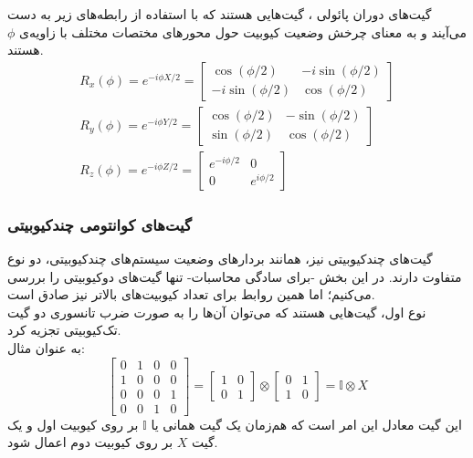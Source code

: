 گیت‌های دوران پائولی
، گیت‌هایی هستند که با استفاده از رابطه‌های زیر به دست می‌آیند و به معنای چرخش وضعیت کیوبیت حول محورهای مختصات مختلف با زاویه‌ی 
$\phi$
هستند.
\begin{equation}
\begin{gathered}
    R_x(\phi) = e^{-i \phi X/2} = 
            \begin{bmatrix}
                \cos(\phi/2) & -i\sin(\phi/2) \\
                -i\sin(\phi/2) & \cos(\phi/2)
            \end{bmatrix}
            \\[3pt]
    R_y(\phi) = e^{-i\phi Y/2} = 
            \begin{bmatrix}
                \cos(\phi/2) & -\sin(\phi/2) \\
                \sin(\phi/2) & \cos(\phi/2)
            \end{bmatrix}
            \\[3pt]
    R_z(\phi) = e^{-i\phi Z/2} = \begin{bmatrix}
                e^{-i\phi/2} & 0 \\
                0 & e^{i\phi/2}
            \end{bmatrix}
\end{gathered}
\end{equation}

\subsubsection{
    گیت‌های کوانتومی چند‌کیوبیتی
}
گیت‌های چندکیوبیتی نیز، همانند بردارهای وضعیت سیستم‌های چندکیوبیتی، دو نوع متفاوت دارند. در این بخش -برای سادگی محاسبات- تنها گیت‌های دوکیوبیتی را بررسی می‌کنیم؛ اما همین روابط برای تعداد کیوبیت‌های بالاتر نیز صادق است. \\
نوع اول، گیت‌هایی هستند که می‌توان آن‌ها را به صورت ضرب تانسوری دو گیت تک‌کیوبیتی تجزیه کرد.
\\
به عنوان مثال:
\begin{equation}
    \begin{bmatrix}
    0 & 1 & 0 & 0 \\[3pt]
    1 & 0 & 0 & 0 \\[3pt]
    0 & 0 & 0 & 1 \\[3pt]
    0 & 0 & 1 & 0 
    \end{bmatrix} =
    \begin{bmatrix}
    1 & 0 \\[3pt]
    0 & 1 
    \end{bmatrix} \otimes
    \begin{bmatrix}
    0 & 1 \\[3pt]
    1 & 0
    \end{bmatrix}
    = \mathbb{I} \otimes X
\end{equation}
این گیت معادل این امر است که هم‌زمان یک گیت همانی یا
$\mathbb{I}$
بر روی کیوبیت اول و یک گیت
$X$
بر روی کیوبیت دوم اعمال شود.

